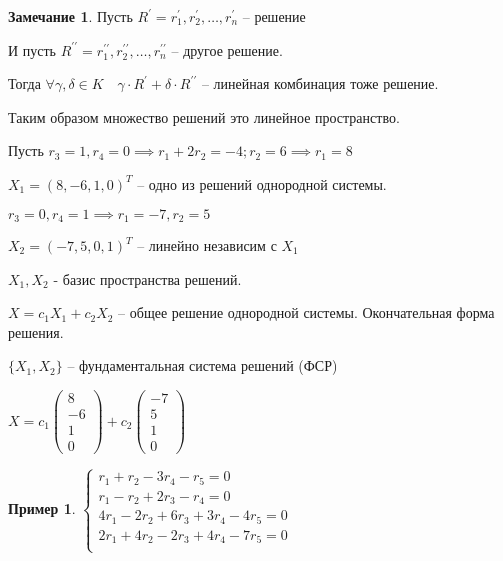 \documentclass{book}
\newcommand{\p}[1]{#1^{\prime}}
\newcommand{\pp}[1]{#1^{\prime\prime}}
\theoremstyle{definition}
\newtheorem*{note}{Замечание}
\newtheorem*{example}{Пример}
\begin{document}
\begin{enumerate}
\begin{note}
            Пусть $\p R = \p r_1, \p r_2, \ldots, \p r_n$ -- решение

            И пусть $\pp R = \pp r_1, \pp r_2, \ldots, \pp r_n$ -- другое решение.
        
            Тогда $\forall \gamma, \delta\in K\quad \gamma\cdot \p R + \delta\cdot \pp R$ -- линейная комбинация тоже решение.

            Таким образом множество решений это линейное пространство.

            Пусть $r_3=1, r_4=0 \implies  r_1+2r_2=-4;r_2=6 \implies  r_1=8$

            $X_1 = (8,-6,1,0)^T$ -- одно из решений однородной системы.

            $r_3=0, r_4=1 \implies  r_1=-7, r_2=5$

            $X_2=(-7,5,0,1)^T$ -- линейно независим с $X_1$

            $X_1, X_2$ - базис пространства решений.

            $X = c_1X_1 + c_2X_2$ -- общее решение однородной системы. Окончательная форма решения.

            $\{X_1, X_2\}$ -- фундаментальная система решений (ФСР)

            $X = c_1\begin{pmatrix} 8\\-6\\1\\0 \end{pmatrix} +c_2\begin{pmatrix} -7\\5\\1\\0 \end{pmatrix} $
        \end{note}

        
\begin{example}
    $\begin{cases}
        r_1+r_2-3r_4-r_5=0\\
        r_1-r_2+2r_3-r_4=0\\
        4r_1-2r_2+6r_3+3r_4-4r_5=0\\
        2r_1+4r_2-2r_3+4r_4-7r_5=0\\
    \end{cases}$ 


\end{example}
\end{enumerate}
\end{document}
